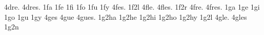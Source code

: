 {4dre.                                                                           
4dres.                                                                          
1fa                                                                             
1fe                                                                             
1fi                                                                             
1fo                                                                             
1fu                                                                             
1fy                                                                             
4fes.                                                                           
1f2l                                                                            
4fle.                                                                           
4fles.                                                                          
1f2r                                                                            
4fre.                                                                           
4fres.                                                                          
1ga                                                                             
1ge                                                                             
1gi                                                                             
1go                                                                             
1gu                                                                             
1gy                                                                             
4ges                                                                            
4gue                                                                            
4gues.                                                                          
1g2ha                                                                           
1g2he                                                                           
1g2hi                                                                           
1g2ho                                                                           
1g2hy                                                                           
1g2l                                                                            
4gle.                                                                           
4gles                                                                           
1g2n                                                                            
}

